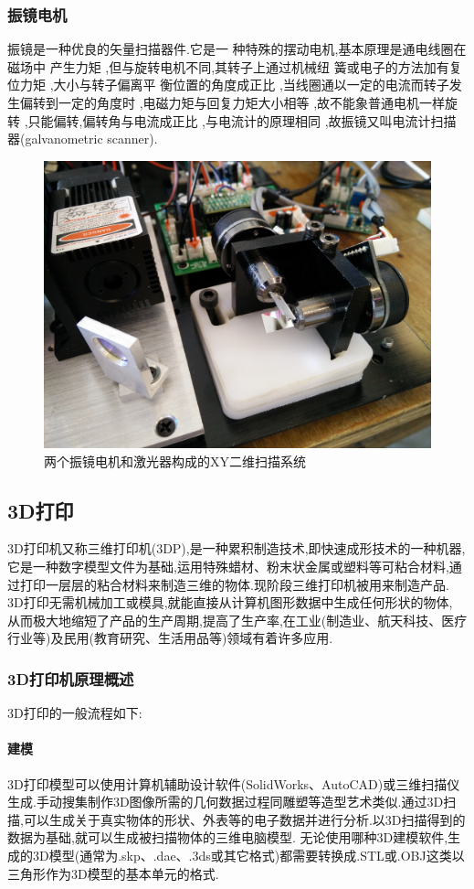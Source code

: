 \documentclass[a4paper,12pt,onecolumn,twoside]{article}
\begin{document}
\subsubsection{振镜电机}
振镜是一种优良的矢量扫描器件.它是一 种特殊的摆动电机,基本原理是通电线圈在磁场中 产生力矩 ,但与旋转电机不同,其转子上通过机械纽 簧或电子的方法加有复位力矩 ,大小与转子偏离平 衡位置的角度成正比 ,当线圈通以一定的电流而转子发生偏转到一定的角度时 ,电磁力矩与回复力矩大小相等 ,故不能象普通电机一样旋转 ,只能偏转,偏转角与电流成正比 ,与电流计的原理相同 ,故振镜又叫电流计扫描器(galvanometric scanner).
\begin{figure}[ht]
\centering
\includegraphics[width=\linewidth]{MG2.jpg}
\caption{两个振镜电机和激光器构成的XY二维扫描系统}
\end{figure}

\subsection{3D打印}
3D打印机又称三维打印机(3DP),是一种累积制造技术,即快速成形技术的一种机器,它是一种数字模型文件为基础,运用特殊蜡材、粉末状金属或塑料等可粘合材料,通过打印一层层的粘合材料来制造三维的物体.现阶段三维打印机被用来制造产品. 3D打印无需机械加工或模具,就能直接从计算机图形数据中生成任何形状的物体, 从而极大地缩短了产品的生产周期,提高了生产率,在工业(制造业、航天科技、医疗行业等)及民用(教育研究、生活用品等)领域有着许多应用.
\subsubsection{3D打印机原理概述}
3D打印的一般流程如下:
\paragraph{建模}
3D打印模型可以使用计算机辅助设计软件(SolidWorks、AutoCAD)或三维扫描仪生成.手动搜集制作3D图像所需的几何数据过程同雕塑等造型艺术类似.通过3D扫描,可以生成关于真实物体的形状、外表等的电子数据并进行分析.以3D扫描得到的数据为基础,就可以生成被扫描物体的三维电脑模型.
无论使用哪种3D建模软件,生成的3D模型(通常为.skp、.dae、.3ds或其它格式)都需要转换成.STL或.OBJ这类以三角形作为3D模型的基本单元的格式.
\end{document}
